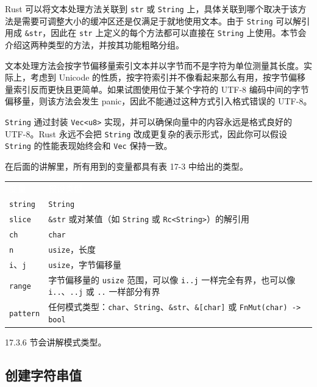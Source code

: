 Rust 可以将文本处理方法关联到 \texttt{str} 或 \texttt{String} 上，具体关联到哪个取决于该方法是需要可调整大小的缓冲区还是仅满足于就地使用文本。由于 \texttt{String} 可以解引用成 \texttt{\&str}，因此在 \texttt{str} 上定义的每个方法都可以直接在 \texttt{String} 上使用。本节会介绍这两种类型的方法，并按其功能粗略分组。

文本处理方法会按字节偏移量索引文本并以字节而不是字符为单位测量其长度。实际上，考虑到 Unicode 的性质，按字符索引并不像看起来那么有用，按字节偏移量索引反而更快且更简单。如果试图使用位于某个字符的 UTF-8 编码中间的字节偏移量，则该方法会发生 panic，因此不能通过这种方式引入格式错误的 UTF-8。

\texttt{String} 通过封装 \texttt{Vec<u8>} 实现，并可以确保向量中的内容永远是格式良好的 UTF-8。Rust 永远不会把 \texttt{String} 改成更复杂的表示形式，因此你可以假设 \texttt{String} 的性能表现始终会和 \texttt{Vec} 保持一致。

在后面的讲解里，所有用到的变量都具有表 17-3 中给出的类型。


\myTableBegin
\begin{tabularx}{\textwidth}{@{}>{\hsize=0.562\hsize\raggedright\arraybackslash}X>{\hsize=1.438\hsize\raggedright\arraybackslash}X@{}}
\rowcolor{tabhead}\textcolor{white}{变量} & \textcolor{white}{预设类型} \\
\texttt{string} & \texttt{String} \\
\texttt{slice} & \texttt{\&str} 或对某值（如 \texttt{String} 或 \texttt{Rc<String>}）的解引用 \\
\texttt{ch} & \texttt{char} \\
\texttt{n} & \texttt{usize}，长度 \\
\texttt{i}、\texttt{j} & \texttt{usize}，字节偏移量 \\
\texttt{range} & 字节偏移量的 \texttt{usize} 范围，可以像 \texttt{i..j} 一样完全有界，也可以像 \texttt{i..}、\texttt{..j} 或 \texttt{..} 一样部分有界 \\
\texttt{pattern} & 任何模式类型：\texttt{char}、\texttt{String}、\texttt{\&str}、\texttt{\&[char]} 或 \texttt{FnMut(char) -> bool} \\
\end{tabularx}
\myTableEnd

17.3.6 节会讲解模式类型。

\subsection{创建字符串值}


